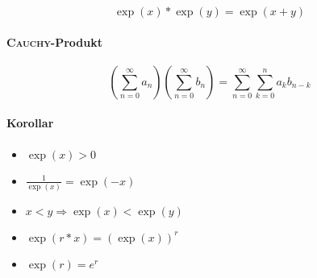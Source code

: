 $$\exp(x) * \exp(y) = \exp(x + y)$$

\paragraph{\textsc{Cauchy}-Produkt}

$$(\sum_{n = 0}^\infty a_n)(\sum_{n = 0}^\infty b_n) = \sum_{n = 0}^\infty \sum_{k = 0}^n a_k b_{n - k}$$

\paragraph{Korollar}

\begin{itemize}
      \item $\exp (x) > 0$
      \item $\frac{1}{\exp (x)} = \exp (-x)$
      \item $x < y \Rightarrow \exp (x) < \exp (y)$
      \item $\exp(r * x) = (\exp (x))^r$
      \item $\exp(r) = e^r$
\end{itemize}